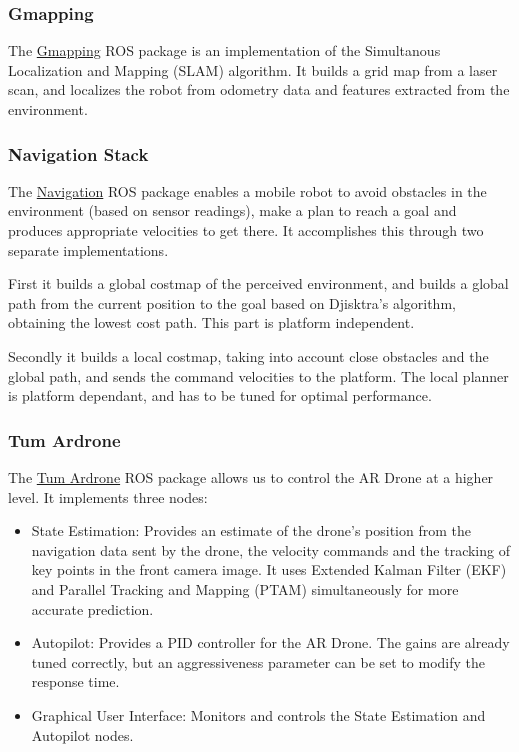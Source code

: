 \documentclass[11pt,a4paper]{article}
\begin{document}
\subsubsection{Gmapping}
The \href{http://wiki.ros.org/gmapping}{Gmapping} ROS package is an implementation of the Simultanous Localization and Mapping (SLAM) algorithm. It builds a grid map from a laser scan, and localizes the robot from odometry data and features extracted from the environment.

\subsubsection{Navigation Stack}
The \href{http://wiki.ros.org/navigation}{Navigation} ROS package enables a mobile robot to avoid obstacles in the environment (based on sensor readings), make a plan to reach a goal and produces appropriate velocities to get there. It accomplishes this through two separate implementations. 

First it builds a global costmap of the perceived environment, and builds a global path from the current position to the goal based on Djisktra's algorithm, obtaining the lowest cost path. This part is platform independent. 

Secondly it builds a local costmap, taking into account close obstacles and the global path, and sends the command velocities to the platform. The local planner is  platform dependant, and has to be tuned for optimal performance.

\subsubsection{Tum Ardrone}
The \href{http://wiki.ros.org/tum_ardrone}{Tum Ardrone} ROS package allows us to control the AR Drone at a higher level. It implements three nodes: 

\begin{itemize}
\item State Estimation: Provides an estimate of the drone's position from the navigation data sent by the drone, the velocity commands and the tracking of key points in the front camera image. It uses Extended Kalman Filter (EKF) and Parallel Tracking and Mapping (PTAM) simultaneously for more accurate prediction.

\item Autopilot: Provides a PID controller for the AR Drone. The gains are already tuned correctly, but an aggressiveness parameter can be set to modify the response time.

\item Graphical User Interface: Monitors and controls the State Estimation and Autopilot nodes.

\end{itemize}
\end{document}
